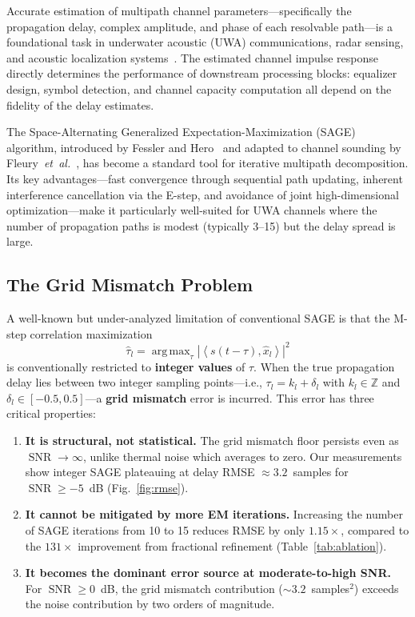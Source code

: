 \documentclass[a4paper,fleqn]{cas-dc}
\DeclareMathOperator*{\argmax}{arg\,max}
\DeclareMathOperator{\SNR}{SNR}
\newcommand{\Zz}{\mathbb{Z}}
\newcommand{\abs}[1]{\left| #1 \right|}
\newcommand{\inner}[2]{\left\langle #1, #2 \right\rangle}
\newcommand{\hb}[1]{\hat{#1}}
\begin{document}
Accurate estimation of multipath channel parameters---specifically the propagation delay, complex amplitude, and phase of each resolvable path---is a foundational task in underwater acoustic (UWA) communications, radar sensing, and acoustic localization systems~\cite{stojanovic2009,eggen2001}. The estimated channel impulse response directly determines the performance of downstream processing blocks: equalizer design, symbol detection, and channel capacity computation all depend on the fidelity of the delay estimates.

The Space-Alternating Generalized Expectation-Maximization (SAGE) algorithm, introduced by Fessler and Hero~\cite{fessler1994} and adapted to channel sounding by Fleury~\textit{et~al.}~\cite{fleury1999}, has become a standard tool for iterative multipath decomposition. Its key advantages---fast convergence through sequential path updating, inherent interference cancellation via the E-step, and avoidance of joint high-dimensional optimization---make it particularly well-suited for UWA channels where the number of propagation paths is modest (typically 3--15) but the delay spread is large.

\subsection{The Grid Mismatch Problem}

A well-known but under-analyzed limitation of conventional SAGE is that the M-step correlation maximization
\begin{equation}
\hb{\tau}_l = \argmax_{\tau} \abs{\inner{s(t-\tau)}{\hb{x}_l}}^2
\label{eq:mstep}
\end{equation}
is conventionally restricted to \textbf{integer values} of $\tau$. When the true propagation delay lies between two integer sampling points---i.e., $\tau_l = k_l + \delta_l$ with $k_l \in \Zz$ and $\delta_l \in [-0.5, 0.5]$---a \textbf{grid mismatch} error is incurred. This error has three critical properties:

\begin{enumerate}
\item \textbf{It is structural, not statistical.} The grid mismatch floor persists even as $\SNR \to \infty$, unlike thermal noise which averages to zero. Our measurements show integer SAGE plateauing at delay RMSE $\approx 3.2$~samples for $\SNR \ge -5$~dB (Fig.~\ref{fig:rmse}).

\item \textbf{It cannot be mitigated by more EM iterations.} Increasing the number of SAGE iterations from 10 to 15 reduces RMSE by only $1.15\times$, compared to the $131\times$ improvement from fractional refinement (Table~\ref{tab:ablation}).

\item \textbf{It becomes the dominant error source at moderate-to-high SNR.} For $\SNR \ge 0$~dB, the grid mismatch contribution ($\sim 3.2$~samples$^2$) exceeds the noise contribution by two orders of magnitude.
\end{enumerate}
\end{document}
